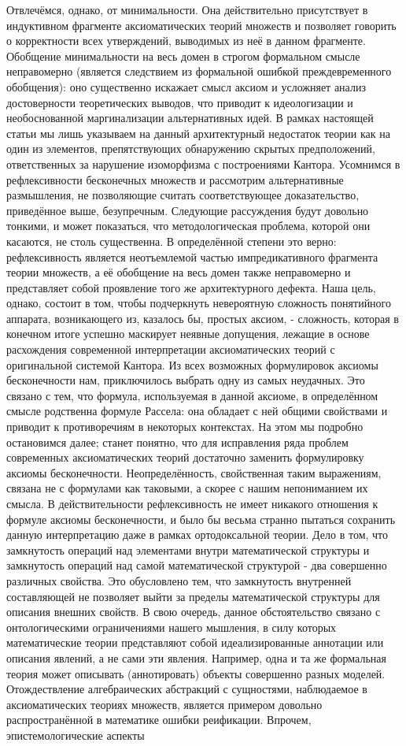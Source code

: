 \documentclass[12pt]{article}
\begin{document}
Отвлечёмся, однако, от минимальности. Она действительно присутствует в индуктивном фрагменте аксиоматических теорий множеств и позволяет говорить о корректности всех утверждений, выводимых из неё в данном фрагменте. Обобщение минимальности на весь домен в строгом формальном смысле неправомерно (является следствием из формальной ошибкой преждевременного обобщения): оно существенно искажает смысл аксиом и усложняет анализ достоверности теоретических выводов, что приводит к идеологизации и необоснованной маргинализации альтернативных идей. В рамках настоящей статьи мы лишь указываем на данный архитектурный недостаток теории как на один из элементов, препятствующих обнаружению скрытых предположений, ответственных за нарушение изоморфизма с построениями Кантора. Усомнимся в рефлексивности бесконечных множеств и рассмотрим альтернативные размышления, не позволяющие считать соответствующее доказательство, приведённое выше, безупречным. Следующие рассуждения будут довольно тонкими, и может показаться, что методологическая проблема, которой они касаются, не столь существенна. В определённой степени это верно: рефлексивность является неотъемлемой частью импредикативного фрагмента теории множеств, а её обобщение на весь домен также неправомерно и представляет собой проявление того же архитектурного дефекта. Наша цель, однако, состоит в том, чтобы подчеркнуть невероятную сложность понятийного аппарата, возникающего из, казалось бы, простых аксиом, - сложность, которая в конечном итоге успешно маскирует неявные допущения, лежащие в основе расхождения современной интерпретации аксиоматических теорий с оригинальной системой Кантора. Из всех возможных формулировок аксиомы бесконечности нам, приключилось выбрать одну из самых неудачных. Это связано с тем, что формула, используемая в данной аксиоме, в определённом смысле родственна формуле Рассела: она обладает с ней общими свойствами и приводит к противоречиям в некоторых контекстах. На этом мы подробно остановимся далее; станет понятно, что для исправления ряда проблем современных аксиоматических теорий достаточно заменить формулировку аксиомы бесконечности. Неопределённость, свойственная таким выражениям, связана не с формулами как таковыми, а скорее с нашим непониманием их смысла. В действительности рефлексивность не имеет никакого отношения к формуле аксиомы бесконечности, и было бы весьма странно пытаться сохранить данную интерпретацию даже в рамках ортодоксальной теории. Дело в том, что замкнутость операций над элементами внутри математической структуры и замкнутость операций над самой математической структурой - два совершенно различных свойства. Это обусловлено тем, что замкнутость внутренней составляющей не позволяет выйти за пределы математической структуры для описания внешних свойств. В свою очередь, данное обстоятельство связано с онтологическими ограничениями нашего мышления, в силу которых математические теории представляют собой идеализированные аннотации или описания явлений, а не сами эти явления. Например, одна и та же формальная теория может описывать (аннотировать) объекты совершенно разных моделей. Отождествление алгебраических абстракций с сущностями, наблюдаемое в аксиоматических теориях множеств, является примером довольно распространённой в математике ошибки реификации. Впрочем, эпистемологические аспекты 
\end{document}
